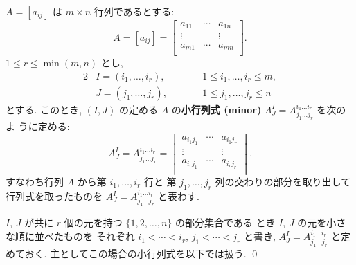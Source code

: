 \documentclass[12pt,twoside]{jarticle}
\begin{document}
\begin{definition}[小行列式]
  $A=[a_{ij}]$ は $m\times n$ 行列であるとする:
  \begin{equation*}
    A = [a_{ij}] = 
    \begin{bmatrix}
      a_{11} & \cdots & a_{1n} \\
      \vdots &        & \vdots \\
      a_{m1} & \cdots & a_{mn} \\
    \end{bmatrix}.
  \end{equation*}
  $1\le r \le \min(m,n)$ とし, 
  \begin{alignat*}{2}
    & I = (i_1,\ldots,i_r), & \qquad & 1\le i_1,\ldots,i_r\le m, \\
    & J = (j_1,\ldots,j_r), & \qquad & 1\le j_1,\ldots,j_r\le n
  \end{alignat*}
  とする. このとき, $(I,J)$ の定める $A$ 
  の{\bf 小行列式 (minor)} $A^I_J=A^{i_1\ldots i_r}_{j_1\ldots j_r}$ を次のよ
  うに定める:
  \begin{equation*}
    A^I_J = A^{i_1\ldots i_r}_{j_1\ldots j_r} =
    \begin{vmatrix}
      a_{i_1j_1} & \cdots & a_{i_1j_r} \\
      \vdots     &        & \vdots \\
      a_{i_rj_1} & \cdots & a_{i_rj_r} \\
    \end{vmatrix}.
  \end{equation*}
  すなわち行列 $A$ から第 $i_1,\ldots,i_r$ 行と
  第 $j_1,\ldots,j_r$ 列の交わりの部分を取り出して
  行列式を取ったものを $A^I_J=A^{i_1\ldots i_r}_{j_1\ldots j_r}$ と表わす.

  $I$, $J$ が共に $r$ 個の元を持つ $\{1,2,\ldots,n\}$ の部分集合である
  とき $I$, $J$ の元を小さな順に並べたものを
  それぞれ $i_1<\cdots<i_r$, $j_1<\cdots<j_r$ と書き,
  $A^I_J=A^{i_1\ldots i_r}_{j_1\ldots j_r}$ と定めておく.
  主としてこの場合の小行列式を以下では扱う.
  \qed
\end{definition}

\end{document}
